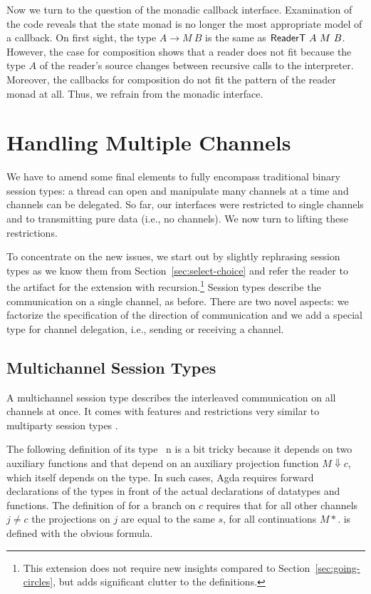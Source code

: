 \documentclass[acmsmall,screen]{acmart}
\begin{document}
Now we turn to the question of the monadic callback interface. 
Examination of the code reveals that the state monad is no longer the most appropriate model of a
callback. On first sight, the type $A \to 
M~B$ is the same as $\AReaderT~A~M~B $. However, the case 
for composition shows that a reader does not fit because
the type $A$ of the reader's source changes between recursive calls to
the interpreter. Moreover, the callbacks for composition do not fit
the pattern of the reader monad at all.
Thus, we refrain from the monadic interface.


\section{Handling Multiple Channels}
\label{sec:handl-mult-chann}


We have to amend some final elements to fully encompass traditional binary
session types: a thread can open and manipulate many channels at a
time and channels can be delegated. So far, our interfaces were
restricted to single channels and to transmitting pure data (i.e., no channels). We
now turn to lifting these restrictions.

To concentrate on the new issues, 
we start out by slightly rephrasing session types as we
know them from Section~\ref{sec:select-choice} and
refer the reader to the artifact for the extension with
recursion.\footnote{This extension does not require new insights
  compared to Section~\ref{sec:going-circles}, but
  adds significant clutter to the definitions.} Session types describe
the communication on a single channel, as before. There are two novel
aspects: we factorize the specification of the direction of
communication and we add a special type for channel delegation, i.e.,
sending or receiving a channel.

\multiSession

\subsection{Multichannel Session Types}
\label{sec:mult-sess-types-1}

A multichannel session type describes the interleaved
communication on all channels at once. It comes with features and
restrictions very similar to multiparty session types
\cite{DBLP:journals/jacm/HondaYC16}.

The following definition of its type  {\AMSession~n} is a bit tricky
because it depends on two auxiliary functions {\ACausality} and
{\ACheckDual} that depend on an auxiliary projection function
{$M\Downarrow c$}, 
which itself depends on the {\AMSession} type. In such cases, Agda
requires forward declarations of the types in front of the actual
declarations of datatypes and functions. The definition of
{\ACausality} for a branch on $c$ requires that for all other channels $j\ne c$ the
projections on $j$ are equal to the same $s$, for all continuations
$M*$.
{\ACheckDual} is defined with the obvious formula.
\end{document}
